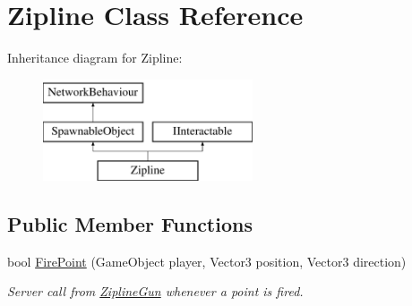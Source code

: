 \hypertarget{class_zipline}{}\section{Zipline Class Reference}
\label{class_zipline}
Inheritance diagram for Zipline\+:\begin{figure}[H]
\begin{center}
\leavevmode
\includegraphics[height=3.000000cm]{class_zipline}
\end{center}
\end{figure}
\subsection*{Public Member Functions}
\begin{DoxyCompactItemize}
\item 
bool \hyperlink{class_zipline_aedd3380abb8951cea6196b7c4ef4d26d}{Fire\+Point} (Game\+Object player, Vector3 position, Vector3 direction)
\begin{DoxyCompactList}\small\item\em Server call from \hyperlink{class_zipline_gun}{Zipline\+Gun} whenever a point is fired. \end{DoxyCompactList}\end{DoxyCompactItemize}
